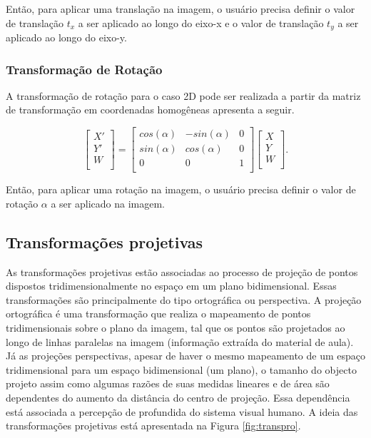 \documentclass{article}
\begin{document}
\noindent
Então, para aplicar uma translação na imagem, o usuário precisa definir o valor de translação $t_x$ a ser aplicado ao longo do eixo-x e o valor de translação $t_y$ a ser aplicado ao longo do eixo-y.

\subsubsection{Transformação de Rotação} 
A transformação de rotação para o caso 2D pode ser realizada a partir da matriz de transformação em coordenadas homogêneas apresenta a seguir.

\begin{equation}
\begin{bmatrix} 
X'\\
Y'\\
W \\
\end{bmatrix}
=
\begin{bmatrix} 
cos(\alpha) & -sin(\alpha) & 0 \\
sin(\alpha) & cos(\alpha)  & 0 \\
0           & 0            & 1 \\
\end{bmatrix}
%
\begin{bmatrix} 
X \\
Y \\
W \\
\end{bmatrix}.
\label{eq:transrot}
\end{equation}

\noindent
Então, para aplicar uma rotação na imagem, o usuário precisa definir o valor de rotação $\alpha$ a ser aplicado na imagem.

\subsection{Transformações projetivas}
As transformações projetivas estão associadas ao processo de projeção de pontos dispostos tridimensionalmente no espaço em um plano bidimensional. Essas transformações são principalmente do tipo ortográfica ou perspectiva. A projeção ortográfica é uma transformação que realiza o mapeamento de pontos tridimensionais sobre o plano da imagem, tal que os pontos são projetados ao longo de linhas paralelas na imagem (informação extraída do material de aula). Já as projeções perspectivas, apesar de haver o mesmo mapeamento de um espaço tridimensional para um espaço bidimensional (um plano), o tamanho do objecto projeto assim como algumas razões de suas medidas lineares e de área são dependentes do aumento da distância do centro de projeção. Essa dependência está associada a percepção de profundida do sistema visual humano. A ideia das transformações projetivas está apresentada na Figura \ref{fig:transpro}.
\end{document}
